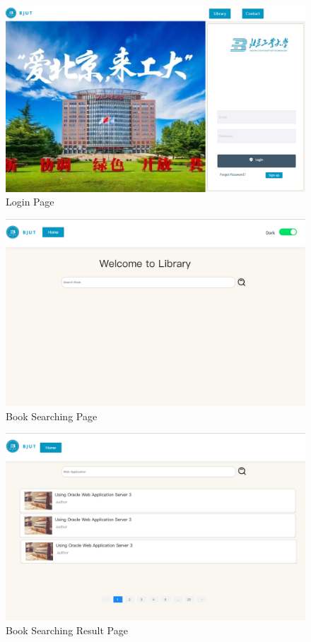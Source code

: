\documentclass[12pt]{article}
\begin{document}
\begin{figure}[H]
    \centering
    \includegraphics[width=\textwidth]{mockups/common/login.png}
    \caption{Login Page}
    \label{fig:login_page}
\end{figure}

\begin{figure}[H]
    \centering
    \includegraphics[width=\textwidth]{mockups/common/searchbook.png}
    \caption{Book Searching Page}
    \label{fig:searchbook_page}
\end{figure}

\begin{figure}[H]
    \centering
    \includegraphics[width=\textwidth]{mockups/common/searchbookresult.png}
    \caption{Book Searching Result Page}
    \label{fig:searchbookresult_page}
\end{figure}
\end{document}
